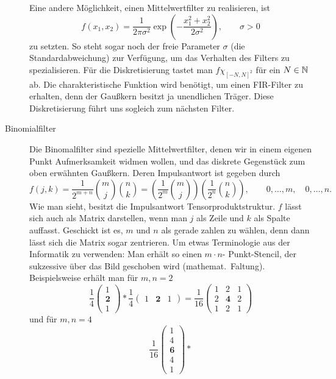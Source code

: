 \begin{example}
\begin{description}
  Eine andere Möglichkeit, einen Mittelwertfilter zu realisieren, ist
  \[
    f(x_{1},x_{2}) 
      = \frac{1}{2\pi\sigma^{2}} \exp\left( -\frac{x_{1}^{2} + x_{2}^{2}}{2\sigma^{2}} \right),
      \qquad \sigma > 0
  \]
  zu setzten. So steht sogar noch der freie Parameter $ \sigma $ (die Standardabweichung) zur 
  Verfügung, um das Verhalten des Filters zu spezialisieren. Für die Diskretisierung tastet man
  $ f\chi_{[-N,N]^{2}} $ für ein $ N \in \mathbb{N} $ ab. Die charakteristische Funktion wird benötigt, um 
  einen FIR-Filter zu erhalten, denn der Gaußkern besitzt ja unendlichen Träger. Diese 
  Diskretisierung führt uns sogleich zum nächsten Filter.
\item [Binomialfilter]
  Die Binomalfilter sind spezielle Mittelwertfilter, denen wir in einem eigenen Punkt 
  Aufmerksamkeit widmen wollen, und das diskrete Gegenstück zum oben erwähnten Gaußkern. Deren 
  Impulsantwort ist gegeben durch
  \[
      f(j,k)
    = \frac{1}{2^{m + n}} \binom{m}{j} \binom{n}{k}
    = \left( \frac{1}{2^{m}} \binom{m}{j} \right) \left( \frac{1}{2^{n}} \binom{n}{k} \right),
      \qquad 0, \ldots, m, \quad 0, \ldots, n.
  \]
  Wie man sieht, besitzt die Impulsantwort Tensorproduktstruktur. $ f $ lässt sich auch 
  als Matrix darstellen, wenn man $ j $ als Zeile und $ k $ als Spalte auffasst. Geschickt ist es, 
  $ m $ und $ n $ als gerade zahlen zu wählen, denn dann lässt sich die Matrix sogar zentrieren. Um 
  etwas Terminologie aus der Informatik zu verwenden: Man erhält so einen $ m \cdot n $-%
  Punkt-Stencil, der sukzessive über das Bild geschoben wird (mathemat.\ Faltung). Beispielsweise 
  erhält man für $ m,n = 2 $
  \[
      \frac{1}{4} \begin{pmatrix} 1 \\ \mathbf{2} \\ 1 \end{pmatrix} *
        \frac{1}{4} \begin{pmatrix} 1 & \mathbf{2} & 1 \end{pmatrix}
    = \frac{1}{16} \begin{pmatrix}
        1 & 2 & 1 \\
        2 & \mathbf{4} & 2 \\
        1 & 2 & 1
      \end{pmatrix}
  \]
  und für $ m,n=4 $
  \[
      \frac{1}{16} \begin{pmatrix} 1 \\ 4 \\ \mathbf{6} \\ 4 \\ 1 \end{pmatrix} *
\]
\end{description}
\end{example}

